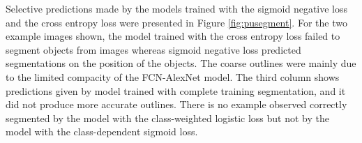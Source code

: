 Selective predictions made by the models trained with the sigmoid negative loss and the cross entropy loss were presented in Figure \ref{fig:pusegment}.
For the two example images shown, the model trained with the cross entropy loss failed to segment objects from images whereas sigmoid negative loss predicted segmentations on the position of the objects.
The coarse outlines were mainly due to the limited compacity of the FCN-AlexNet model.
The third column shows predictions given by model trained with complete training segmentation, and it did not produce more accurate outlines.
There is no example observed correctly segmented by the model with the class-weighted logistic loss but not by the model with the class-dependent sigmoid loss.

\begin{figure}
\centering
  \begin{minipage}{\columnwidth}\footnotesize
  \centering

\end{minipage}
\end{figure}
